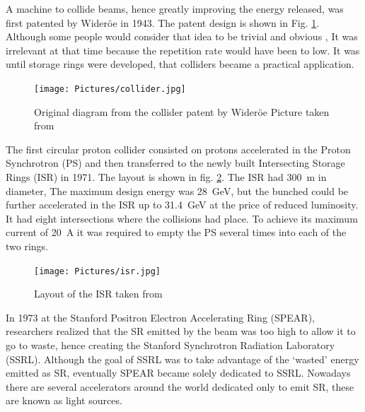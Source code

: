 A machine to collide beams, hence greatly improving the energy released, was
first patented by Wider\"{o}e in 1943\cite{birth}. The patent design is shown in
Fig. \ref{fig:wid:collider}. Although some people would
consider that idea to be trivial and obvious \cite{Amaldi}, It was irrelevant at
that time because the repetition rate would have been to low. It was until
storage rings were developed, that colliders became a practical application.
\begin{figure}
 \centering
  \begin{minipage}{\textwidth}
   \centering
    \texttt{[image: Pictures/collider.jpg]}
    \caption{\label{fig:wid:collider}
        Original diagram from the collider patent by Wider\"oe
                       \footnotesize{Picture taken from }}
  \end{minipage}
\end{figure}
The first circular proton collider consisted on protons accelerated in the
Proton Synchrotron (PS) and then transferred to the newly built Intersecting
Storage Rings (ISR) in 1971. The layout is shown in fig. \ref{fig:isr}. The ISR
had \SI{300}{m} in diameter, The maximum design energy was \SI{28}{GeV}, but the
bunched could be further accelerated in the ISR up to \SI{31.4}{GeV} at the
price of reduced luminosity\cite{isr}. It had eight intersections where the
collisions had place. To achieve its maximum current of \SI{20}{A} it was
required to empty the PS several times into each of the two rings.

\begin{figure}
 \centering
  \begin{minipage}{\textwidth}
   \centering
    \texttt{[image: Pictures/isr.jpg]}
    \caption{\label{fig:isr}
        Layout of the ISR
                       \footnotesize{taken from }}

  \end{minipage}
\end{figure}

In 1973 at the Stanford Positron Electron Accelerating Ring (SPEAR), researchers
realized that the SR emitted by the beam was too high to allow it to go to
waste, hence creating the Stanford Synchrotron Radiation Laboratory
(SSRL). Although the goal of SSRL was to take advantage of the
`wasted' energy emitted as SR, eventually SPEAR became solely dedicated to
SSRL. Nowadays there are several accelerators around the world dedicated only
to emit SR, these are known as light sources.

